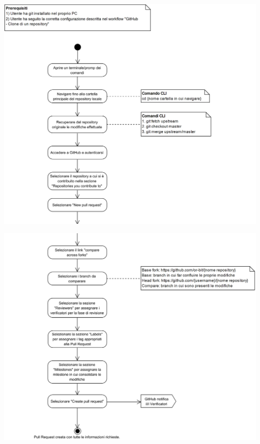\begin{samepage}
	\mbox{}\\
	
	\begin{center}
		\includegraphics[width=15cm]{../../documenti/NormeDiProgetto/DiagrammiProcedure/GitHub-CreazionePullRequest1.png}
	\end{center}	
\end{samepage}

\begin{center}
	\includegraphics[width=15cm]{./DiagrammiProcedure/GitHub-CreazionePullRequest2.png}
\end{center}

